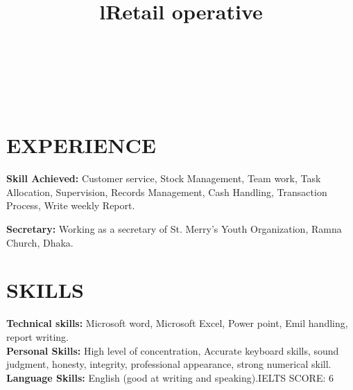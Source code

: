 \documentclass[margin]{res}
\begin{document}
\begin{resume}


\begin{format}
\title{l}\\
\\
\body\\
\end{format}

\section{EXPERIENCE}

\title{\textbf{Retail operative}}
\begin{position}
\textbf{Skill Achieved:}
Customer service, Stock Management, Team work, Task Allocation, Supervision, Records Management, Cash Handling, Transaction Process, Write weekly Report.
\end{position}


\textbf{Secretary:}  Working as a secretary of St. Merry's Youth Organization, Ramna Church, Dhaka.
\section{SKILLS}

\textbf{Technical skills:} Microsoft word, Microsoft Excel, Power point, Emil handling, report writing.
\\
\textbf{Personal Skills:} High level of concentration, Accurate keyboard skills, sound judgment, honesty, integrity, professional appearance, strong numerical skill.
\\
\textbf{Language Skills:} English (good at writing and speaking).IELTS SCORE: 6



\end{resume}
\end{document}
